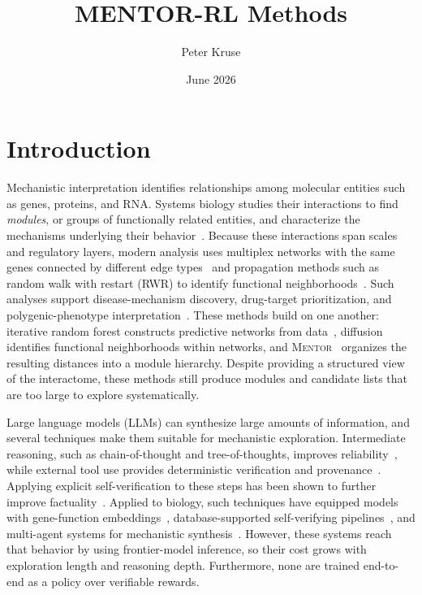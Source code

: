 \documentclass[thesis,letterpaper,12pt]{utthesis}
\title{MENTOR-RL Methods}
\author{Peter Kruse}
\date{June 2026}
\begin{document}
\maketitle

\section{Introduction}

Mechanistic interpretation identifies relationships among molecular entities such as genes, proteins, and RNA. Systems biology studies their interactions to find \textit{modules}, or groups of functionally related entities, and characterize the mechanisms underlying their behavior~\cite{hartwell1999molecular, barabasi2004network}. Because these interactions span scales and regulatory layers, modern analysis uses multiplex networks with the same genes connected by different edge types~\cite{barabasi2011network, mucha2010community, de2013mathematical} and propagation methods such as random walk with restart (RWR) to identify functional neighborhoods~\cite{kohler2008walking, cowen2017network}. Such analyses support disease-mechanism discovery, drug-target prioritization, and polygenic-phenotype interpretation~\cite{menche2015uncovering}. These methods build on one another: iterative random forest constructs predictive networks from data~\cite{basu2018iterative,cliff2019high}, diffusion identifies functional neighborhoods within networks, and \textsc{Mentor}~\cite{mentor} organizes the resulting distances into a module hierarchy. Despite providing a structured view of the interactome, these methods still produce modules and candidate lists that are too large to explore systematically.

Large language models (LLMs) can synthesize large amounts of information, and several techniques make them suitable for mechanistic exploration. Intermediate reasoning, such as chain-of-thought and tree-of-thoughts, improves reliability~\cite{wei2022chain,kojima2022large}, while external tool use provides deterministic verification and provenance~\cite{schick2023toolformer, yao2022react}. Applying explicit self-verification to these steps has been shown to further improve factuality~\cite{madaan2023selfrefine, shinn2023reflexion}. Applied to biology, such techniques have equipped models with gene-function embeddings~\cite{chen2025simple}, database-supported self-verifying pipelines~\cite{wang2025geneagent}, and multi-agent systems for mechanistic synthesis~\cite{mentor-ia, eubiota}. However, these systems reach that behavior by using frontier-model inference, so their cost grows with exploration length and reasoning depth. Furthermore, none are trained end-to-end as a policy over verifiable rewards.
\end{document}
